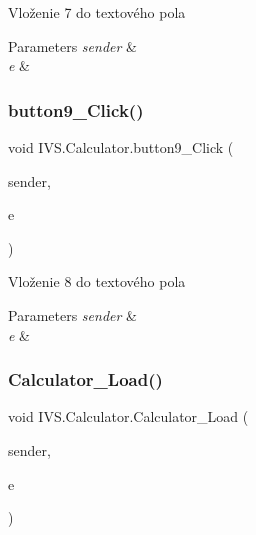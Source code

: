 Vloženie \textquotesingle{}7\textquotesingle{} do textového pola 


\begin{DoxyParams}{Parameters}
{\em sender} & \\
\hline
{\em e} & \\
\hline
\end{DoxyParams}
\mbox{\label{class_i_v_s_1_1_calculator_ad6751dcda5da874d2c4c933020f5bc70}} 
\subsubsection{\texorpdfstring{button9\+\_\+\+Click()}{button9\_Click()}}
{\footnotesize\ttfamily void I\+V\+S.\+Calculator.\+button9\+\_\+\+Click (\begin{DoxyParamCaption}\item[{object}]{sender,  }\item[{Event\+Args}]{e }\end{DoxyParamCaption})\hspace{0.3cm}{\ttfamily [protected]}}



Vloženie \textquotesingle{}8\textquotesingle{} do textového pola 


\begin{DoxyParams}{Parameters}
{\em sender} & \\
\hline
{\em e} & \\
\hline
\end{DoxyParams}
\mbox{\label{class_i_v_s_1_1_calculator_a3c3a8cab086cf9f773e7b4dbddcbad58}} 
\subsubsection{\texorpdfstring{Calculator\+\_\+\+Load()}{Calculator\_Load()}}
{\footnotesize\ttfamily void I\+V\+S.\+Calculator.\+Calculator\+\_\+\+Load (\begin{DoxyParamCaption}\item[{object}]{sender,  }\item[{Event\+Args}]{e }\end{DoxyParamCaption})\hspace{0.3cm}{\ttfamily [protected]}}



